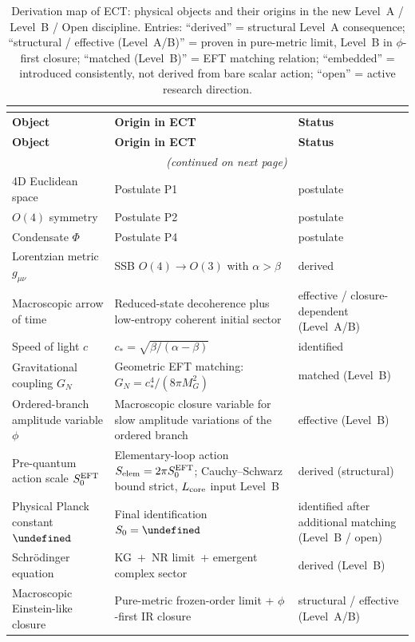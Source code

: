 \documentclass[11pt,a4paper]{article}
\let\hbar\undefined
\numberwithin{equation}{section}
\begin{document}
\begin{longtable}{p{3.2cm}p{7.8cm}p{2.8cm}}
\caption{Derivation map of ECT: physical objects and their origins in the new Level~A / Level~B / Open discipline.
Entries: ``derived'' = structural Level~A consequence; ``structural / effective (Level~A/B)'' = proven in pure-metric limit, Level~B in $\phi$-first closure; ``matched (Level~B)'' = EFT matching relation; ``embedded'' = introduced consistently, not derived from bare scalar action; ``open'' = active research direction.} \\
\label{tab:ect_structure} \\[-6pt]
\toprule
\textbf{Object} & \textbf{Origin in ECT} & \textbf{Status} \\
\midrule
\endfirsthead
\toprule
\textbf{Object} & \textbf{Origin in ECT} & \textbf{Status} \\
\midrule
\endhead
\midrule\multicolumn{2}{r}{\small\textit{(continued on next page)}}\\
\endfoot
\bottomrule
\endlastfoot
4D Euclidean space & Postulate P1 & postulate \\
$O(4)$ symmetry & Postulate P2 & postulate \\
Condensate $\Phi$ & Postulate P4 & postulate \\
Lorentzian metric $g_{\mu\nu}$ & SSB $O(4)\!\to\!O(3)$ with $\alpha>\beta$ & derived \\
Macroscopic arrow of time & Reduced-state decoherence plus low-entropy coherent initial sector & effective / closure-dependent (Level~A/B) \\
Speed of light $c$ & $c_*=\sqrt{\beta/(\alpha-\beta)}$ & identified \\
Gravitational coupling $G_N$ & Geometric EFT matching: $G_N=c_*^4/(8\pi M_G^2)$ & matched (Level~B) \\
Ordered-branch amplitude variable $\phi$ & Macroscopic closure variable for slow amplitude variations of the ordered branch & effective (Level~B) \\
Pre-quantum action scale $S_0^{\rm EFT}$ & Elementary-loop action $S_{\rm elem}=2\pi S_0^{\rm EFT}$; Cauchy--Schwarz bound strict, $L_{\rm core}$ input Level~B & derived (structural) \\
Physical Planck constant $\hbar$ & Final identification $S_0=\hbar$ & identified after additional matching (Level~B / open) \\
Schr\"odinger equation & KG~+~NR limit~+ emergent complex sector & derived (Level~B) \\
Macroscopic Einstein-like closure & Pure-metric frozen-order limit + $\phi$-first IR closure & structural / effective (Level~A/B) \\

\end{longtable}
\end{document}
